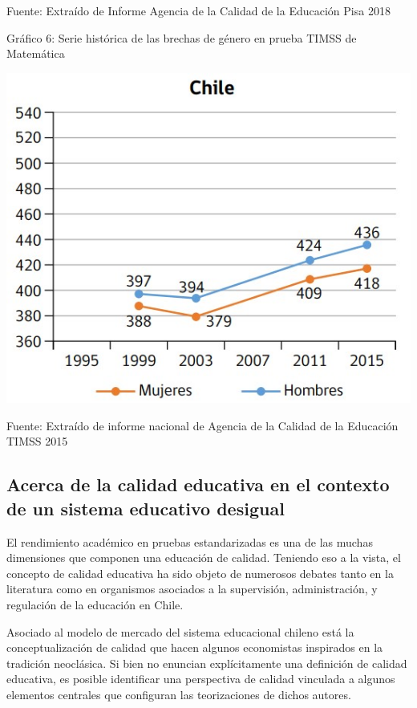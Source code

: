 \documentclass[
]{article}
\begin{document}
Fuente: Extraído de Informe Agencia de la Calidad de la Educación Pisa
2018

Gráfico 6: Serie histórica de las brechas de género en prueba TIMSS de
Matemática

\includegraphics{input/images/brecha_gen_mate_timss.jpg}

Fuente: Extraído de informe nacional de Agencia de la Calidad de la
Educación TIMSS 2015

\hypertarget{acerca-de-la-calidad-educativa-en-el-contexto-de-un-sistema-educativo-desigual}{%
\subsection{Acerca de la calidad educativa en el contexto de un sistema
educativo
desigual}\label{acerca-de-la-calidad-educativa-en-el-contexto-de-un-sistema-educativo-desigual}}

El rendimiento académico en pruebas estandarizadas es una de las muchas
dimensiones que componen una educación de calidad. Teniendo eso a la
vista, el concepto de calidad educativa ha sido objeto de numerosos
debates tanto en la literatura como en organismos asociados a la
supervisión, administración, y regulación de la educación en Chile.

Asociado al modelo de mercado del sistema educacional chileno está la
conceptualización de calidad que hacen algunos economistas inspirados en
la tradición neoclásica. Si bien no enuncian explícitamente una
definición de calidad educativa, es posible identificar una perspectiva
de calidad vinculada a algunos elementos centrales que configuran las
teorizaciones de dichos autores.
\end{document}
